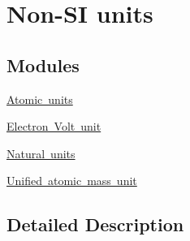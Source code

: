 \hypertarget{group___n_i_s_t_const-_non-_s_i}{}\section{Non-\/\+SI units}
\label{group___n_i_s_t_const-_non-_s_i}
\subsection*{Modules}
\begin{DoxyCompactItemize}
\item 
\mbox{\hyperlink{group___n_i_s_t_const-_atomic_unit}{Atomic units}}
\item 
\mbox{\hyperlink{group___n_i_s_t_const-_electron_volt_unit}{Electron Volt unit}}
\item 
\mbox{\hyperlink{group___n_i_s_t_const-_natural_unit}{Natural units}}
\item 
\mbox{\hyperlink{group___n_i_s_t_const-_unified_atomic_mass_unit}{Unified atomic mass unit}}
\end{DoxyCompactItemize}


\subsection{Detailed Description}
